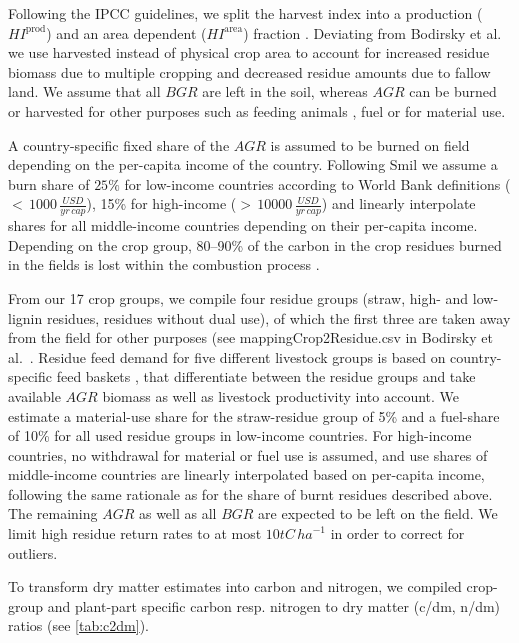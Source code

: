 \documentclass[gc, manuscript]{copernicus}
\begin{document}
Following the IPCC guidelines, we split the harvest index into a production (\(HI^{\mathrm{prod}}\)) and an area dependent (\(HI^{\mathrm{area}}\)) fraction \citep{eggleston_ipcc_2006}. Deviating from Bodirsky et al.~\citeyearpar{bodirsky_n2o_2012} we use harvested instead of physical crop area to account for increased residue biomass due to multiple cropping and decreased residue amounts due to fallow land. We assume that all \(BGR\) are left in the soil, whereas \(AGR\) can be burned or harvested for other purposes such as feeding animals \citep{weindl_livestock_2017}, fuel or for material use.

A country-specific fixed share of the \(AGR\) is assumed to be burned on field depending on the per-capita income of the country. Following Smil \citeyearpar{smil_nitrogen_1999} we assume a burn share of \(25\%\) for low-income countries according to World Bank definitions (\(<\,1000\,\tfrac{USD}{yr\,cap}\)), 15\% for high-income (\(>\,10000\,\tfrac{USD}{yr\,cap}\)) and linearly interpolate shares for all middle-income countries depending on their per-capita income. Depending on the crop group, 80--90\% of the carbon in the crop residues burned in the fields is lost within the combustion process \citep{eggleston_ipcc_2006}.

From our 17 crop groups, we compile four residue groups (straw, high- and low-lignin residues, residues without dual use), of which the first three are taken away from the field for other purposes (see mappingCrop2Residue.csv in Bodirsky et al.~\citeyearpar{bodirsky_mrcommons_2020}. Residue feed demand for five different livestock groups is based on country-specific feed baskets \citep[see][]{weindl_livestock_2017}, that differentiate between the residue groups and take available \(AGR\) biomass as well as livestock productivity into account. We estimate a material-use share for the straw-residue group of 5\% and a fuel-share of 10\% for all used residue groups in low-income countries. For high-income countries, no withdrawal for material or fuel use is assumed, and use shares of middle-income countries are linearly interpolated based on per-capita income, following the same rationale as for the share of burnt residues described above. The remaining \(AGR\) as well as all \(BGR\) are expected to be left on the field. We limit high residue return rates to at most \(10\unit{tC\,ha}^{-1}\) in order to correct for outliers.

To transform dry matter estimates into carbon and nitrogen, we compiled crop-group and plant-part specific carbon resp. nitrogen to dry matter (c/dm, n/dm) ratios (see \ref{tab:c2dm}).
\end{document}
